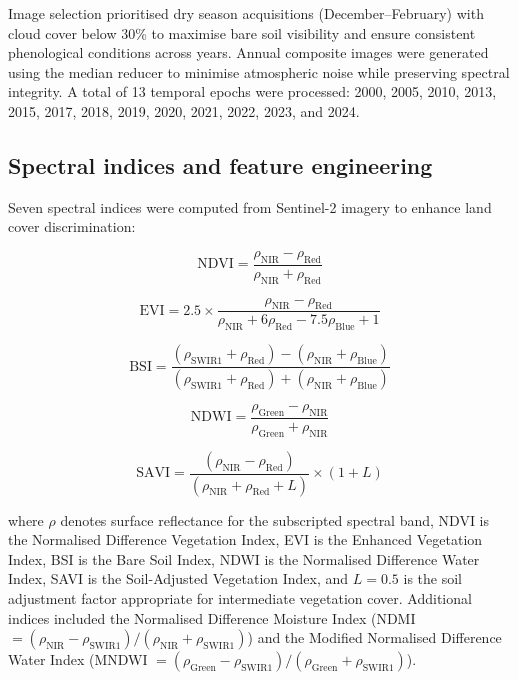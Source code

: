 \documentclass[preprint,12pt,number]{elsarticle}
\begin{document}
Image selection prioritised dry season acquisitions (December--February) with cloud cover below 30\% to maximise bare soil visibility and ensure consistent phenological conditions across years. Annual composite images were generated using the median reducer to minimise atmospheric noise while preserving spectral integrity. A total of 13 temporal epochs were processed: 2000, 2005, 2010, 2013, 2015, 2017, 2018, 2019, 2020, 2021, 2022, 2023, and 2024.


\subsection{Spectral indices and feature engineering}

Seven spectral indices were computed from Sentinel-2 imagery to enhance land cover discrimination:

\begin{equation}
\text{NDVI} = \frac{\rho_\text{NIR} - \rho_\text{Red}}{\rho_\text{NIR} + \rho_\text{Red}}
\label{eq:ndvi}
\end{equation}

\begin{equation}
\text{EVI} = 2.5 \times \frac{\rho_\text{NIR} - \rho_\text{Red}}{\rho_\text{NIR} + 6\rho_\text{Red} - 7.5\rho_\text{Blue} + 1}
\label{eq:evi}
\end{equation}

\begin{equation}
\text{BSI} = \frac{(\rho_\text{SWIR1} + \rho_\text{Red}) - (\rho_\text{NIR} + \rho_\text{Blue})}{(\rho_\text{SWIR1} + \rho_\text{Red}) + (\rho_\text{NIR} + \rho_\text{Blue})}
\label{eq:bsi}
\end{equation}

\begin{equation}
\text{NDWI} = \frac{\rho_\text{Green} - \rho_\text{NIR}}{\rho_\text{Green} + \rho_\text{NIR}}
\label{eq:ndwi}
\end{equation}

\begin{equation}
\text{SAVI} = \frac{(\rho_\text{NIR} - \rho_\text{Red})}{(\rho_\text{NIR} + \rho_\text{Red} + L)} \times (1 + L)
\label{eq:savi}
\end{equation}

\noindent where $\rho$ denotes surface reflectance for the subscripted spectral band, NDVI is the Normalised Difference Vegetation Index, EVI is the Enhanced Vegetation Index, BSI is the Bare Soil Index, NDWI is the Normalised Difference Water Index, SAVI is the Soil-Adjusted Vegetation Index, and $L = 0.5$ is the soil adjustment factor appropriate for intermediate vegetation cover. Additional indices included the Normalised Difference Moisture Index (NDMI $= (\rho_\text{NIR} - \rho_\text{SWIR1}) / (\rho_\text{NIR} + \rho_\text{SWIR1})$) and the Modified Normalised Difference Water Index (MNDWI $= (\rho_\text{Green} - \rho_\text{SWIR1}) / (\rho_\text{Green} + \rho_\text{SWIR1})$).
\end{document}
